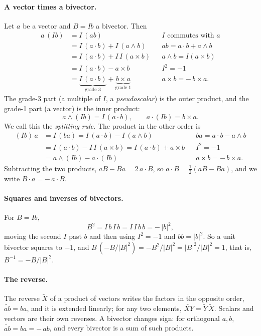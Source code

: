 \paragraph{A vector times a bivector.} Let $a$ be a vector and $B = Ib$ a bivector. Then
\begin{align*}
a\,(I b) &= I\,(a b) && I \text{ commutes with } a \\
&= I\,(a\cdot b) + I\,(a\wedge b) && ab = a\cdot b + a\wedge b \\
&= I\,(a\cdot b) + I\,I\,(a\times b) && a\wedge b = I(a\times b) \\
&= I\,(a\cdot b) - a\times b && I^2 = -1 \\
&= \underbrace{I\,(a\cdot b)}_{\text{grade } 3} + \underbrace{b\times a}_{\text{grade } 1} && a\times b = -\,b\times a .
\end{align*}
The grade-3 part (a multiple of $I$, a \emph{pseudoscalar}) is the outer product, and the grade-1 part (a vector) is the inner product:
\begin{equation*}
a\wedge(Ib) = I\,(a\cdot b), \qquad a\cdot(Ib) = b\times a .
\end{equation*}
We call this the \emph{splitting rule}. The product in the other order is
\begin{align*}
(Ib)\,a &= I\,(b a) = I\,(a\cdot b) - I\,(a\wedge b) && ba = a\cdot b - a\wedge b \\
&= I\,(a\cdot b) - I\,I\,(a\times b) = I\,(a\cdot b) + a\times b && I^2 = -1 \\
&= a\wedge(Ib) - a\cdot(Ib) && a\times b = -\,b\times a .
\end{align*}
Subtracting the two products, $aB - Ba = 2\, a\cdot B$, so $a\cdot B = \frac12(aB - Ba)$, and we write $B\cdot a = -\,a\cdot B$.

\paragraph{Squares and inverses of bivectors.} For $B = Ib$,
\begin{equation*}
B^2 = I\,b\,I\,b = I\,I\,b\,b = -\,|b|^2 ,
\end{equation*}
moving the second $I$ past $b$ and then using $I^2 = -1$ and $bb = |b|^2$. So a unit bivector squares to $-1$, and $B\,(-B/|B|^2) = -B^2/|B|^2 = |B|^2/|B|^2 = 1$, that is, $B^{-1} = -B/|B|^2$.

\paragraph{The reverse.} The reverse $\widetilde X$ of a product of vectors writes the factors in the opposite order, $\widetilde{ab} = ba$, and it is extended linearly; for any two elements, $\widetilde{XY} = \widetilde Y\,\widetilde X$. Scalars and vectors are their own reverses. A bivector changes sign: for orthogonal $a, b$, $\widetilde{ab} = ba = -\,ab$, and every bivector is a sum of such products.

